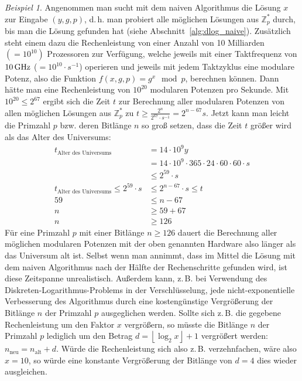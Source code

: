 \documentclass[
  a4paper,
  11pt,
]{scrartcl}
\theoremstyle{plain}
\theoremstyle{definition}
\theoremstyle{remark}
\newtheorem{beispiel}{Beispiel}
\newcommand{\Z}{\mathbb{Z}}
\begin{document}
\begin{beispiel}
  Angenommen man sucht mit dem naiven Algorithmus die Lösung $x$ zur Eingabe
  $(y, g, p)$, d.\,h. man probiert alle möglichen Lösungen aus $\Z_p^*$ durch,
  bis man die Lösung gefunden hat (siehe Abschnitt~\ref{alg:dlog_naive}).
  Zusätzlich steht einem dazu die Rechenleistung von einer Anzahl von 10
  Milliarden $(=10^{10})$ Prozessoren zur Verfügung, welche jeweils mit einer
  Taktfrequenz von $10 \text{\,GHz}$ ($= 10^{10} \cdot s^{-1}$) operieren und
  jeweils mit jedem Taktzyklus eine modulare Potenz, also die Funktion $f(x, g,
  p) = g^x \mod p$, berechnen können.
  Dann hätte man eine Rechenleistung von $10^{20}$ modularen Potenzen pro
  Sekunde.
  Mit $10^{20} \leq 2^{67}$ ergibt sich die Zeit $t$ zur Berechnung aller
  modularen Potenzen von allen möglichen Lösungen aus $\Z_p^*$ zu
  $t \geq \frac{2^n}{2^{67}\cdot s^{-1}}=2^{n-67} s$.
  Jetzt kann man leicht die Primzahl $p$ bzw. deren Bitlänge $n$ so groß setzen,
  dass die Zeit $t$ größer wird als das Alter des Universums:
  \begin{align*}
    t_{\text{Alter des Universums}} & = 14 \cdot 10^9 y\\
    & = 14 \cdot 10^9 \cdot 365 \cdot 24 \cdot 60\cdot 60\cdot s\\
    & \leq 2^{59}\cdot s\\
    t_{\text{Alter des Universums}} \leq 2^{59}\cdot s & \leq 2^{n-67}\cdot s \leq t\\
    59 & \leq n-67\\
    n & \geq 59+67\\
    n & \geq 126
  \end{align*}
  Für eine Primzahl $p$ mit einer Bitlänge $n \geq 126$ dauert die Berechnung
  aller möglichen modularen Potenzen mit der oben genannten Hardware also länger
  als das Universum alt ist. Selbst wenn man annimmt, dass im Mittel die Lösung
  mit dem naiven Algorithmus nach der Hälfte der Rechenschritte gefunden wird,
  ist diese Zeitspanne unrealistisch. Außerdem kann, z.\,B. bei Verwendung des
  Diskreten-Logarithmus-Problems in der Verschlüsselung, jede
  nicht-exponentielle Verbesserung des Algorithmus durch eine kostengünstige
  Vergrößerung der Bitlänge $n$ der Primzahl $p$ ausgeglichen werden. Sollte
  sich z.\,B. die gegebene Rechenleistung um den Faktor $x$ vergrößern, so
  müsste die Bitlänge $n$ der Primzahl $p$ lediglich um den Betrag
  $d = \left\lfloor \log_2 x \right\rfloor + 1$ vergrößert werden:
  $n_{\text{neu}} = n_{\text{alt}} + d$. Würde die Rechenleistung sich also
  z.\,B. verzehnfachen, wäre also $x=10$, so würde eine konstante Vergrößerung
  der Bitlänge von $d=4$ dies wieder ausgleichen.
\end{beispiel}
\end{document}
